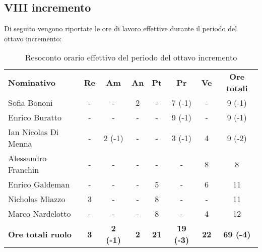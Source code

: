 \documentclass[../piano-di-progetto.tex]{subfiles}
\begin{document}
\subsection{VIII incremento}

Di seguito vengono riportate le ore di lavoro effettive durante il periodo del ottavo incremento:
\begin{table}[H]
    \centering
    \begin{tabular}{lccccccc}
      \rowcolor{lightgray}
      \textbf{Nominativo}       & \textbf{Re}      & \textbf{Am} & \textbf{An}      & \textbf{Pt} & \textbf{Pr} & \textbf{Ve} & \textbf{Ore totali} \\
Sofia Bononi              & -          & -               & 2          & -           & 7 (-1)           & -           & 9 (-1)           \\
Enrico Buratto            & -          & -               & -          & -           & 9 (-1)           & -           & 9 (-1)           \\
Ian Nicolas Di Menna      & -          & 2 (-1)          & -          & -           & 3 (-1)           & 4           & 9 (-2)           \\
Alessandro Franchin       & -          & -               & -          & -           & -                & 8           & 8                \\
Enrico Galdeman           & -          & -               & -          & 5           & -                & 6           & 11               \\
Nicholas Miazzo           & 3          & -               & -          & 8           & -                & -           & 11               \\
Marco Nardelotto          & -          & -               & -          & 8           & -                & 4           & 12               \\
\textbf{Ore totali ruolo} & \textbf{3} & \textbf{2 (-1)} & \textbf{2} & \textbf{21} & \textbf{19 (-3)} & \textbf{22} & \textbf{69 (-4)}
    \end{tabular}
    \caption{Resoconto orario effettivo del periodo del ottavo incremento}
  \end{table}
\end{document}
